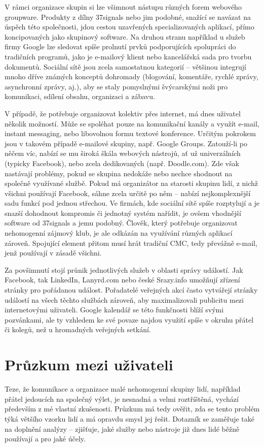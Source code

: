 \documentclass[12pt,oneside,final]{fithesis2}
\begin{document}
V rámci organizace skupin si lze všimnout nástupu různých forem webového groupware. Produkty z dílny 37signals nebo jim podobné, snažící se navázat na úspěch této společnosti, jdou cestou uzavřených specializovaných aplikací, přímo koncipovaných jako skupinový software. Na druhou stranu například u služeb firmy Google lze sledovat spíše prolnutí prvků podporujících spolupráci do tradičních programů, jako je e-mailový klient nebo kancelářská sada pro tvorbu dokumentů. Sociální sítě jsou zcela samostatnou kategorií -- většinou integrují mnoho dříve známých konceptů dohromady (blogování, komentáře, rychlé zprávy, asynchronní zprávy, aj.), aby se staly pomyslnými švýcarskými noži pro komunikaci, sdílení obsahu, organizaci a zábavu.

V případě, že potřebuje organizovat kolektiv přes internet, má dnes uživatel několik možností. Může se spoléhat pouze na komunikační kanály a využít e-mail, instant messaging, nebo libovolnou formu textové konference. Určitým pokrokem jsou v takovém případě e-mailové skupiny, např. Google Groups. Zatouží-li po něčem víc, nabízí se mu široká škála webových nástrojů, ať už univerzálních (typicky Facebook), nebo zcela dedikovaných (např. Doodle.com). Zde však nastávají problémy, pokud se skupina nedokáže nebo nechce shodnout na společně využívané službě. Pokud má organizátor na starosti skupinu lidí, z nichž všichni používají Facebook, sáhne zcela určitě po něm -- nabízí nejkomplexnější sadu funkcí pod jednou střechou. Ve firmách, kde sociální sítě spíše rozptylují a je snazší dohodnout kompromis či jednotný systém nařídit, je ovšem vhodnější software od 37signals a jemu podobný. Člověk, který potřebuje organizovat nehomogenní zájmový klub, je ale odkázán na využívání různých aplikací zároveň. Spojující element přitom musí hrát tradiční CMC, tedy převážně e-mail, jenž používají v zásadě všichni.

Za povšimnutí stojí průnik jednotlivých služeb v oblasti správy událostí. Jak Facebook, tak LinkedIn, Lanyrd.com nebo české Srazy.info umožňují zřízení stránky pro pořádanou událost. Pořadatelé veřejných akcí často vytvářejí stránky událostí na všech těchto službách zároveň, aby maximalizovali publicitu mezi internetovými uživateli. Google kalendář se této funkčnosti blíží svými pozvánkami, ale ty vzhledem ke své povaze najdou využití spíše v okruhu přátel či kolegů, než u hromadných veřejných setkání.


\section{Průzkum mezi uživateli}\label{poll}
Teze, že komunikace a organizace malé nehomogenní skupiny lidí, například přátel jedoucích na společný výlet, je nesnadná a velmi roztříštěná, vychází především z mé vlastní zkušenosti. Průzkum má tedy ověřit, zda se tento problém týká většího vzorku lidí a má opravdu smysl jej řešit. Dotazník se zaměřuje také na doplnění analýzy -- zjišťuje, jaké služby nebo nástroje již dnes lidé běžně používají a pro jaké účely.
\end{document}
